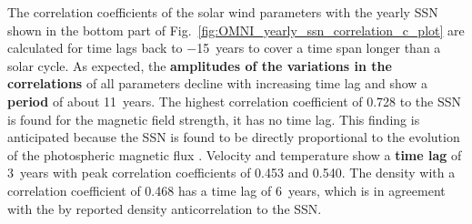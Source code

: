 The correlation coefficients of the solar wind parameters with the yearly SSN shown in the bottom part of Fig.~\ref{fig:OMNI_yearly_ssn_correlation_c_plot} are calculated for time lags back to \num{-15}~years to cover a time span longer than a solar cycle. As expected, the \textbf{amplitudes of the variations in the correlations} of all parameters decline with increasing time lag and show a \textbf{period} of about 11~years. The highest correlation coefficient of 0.728 to the SSN is found for the magnetic field strength, it has no time lag. This finding is anticipated because the SSN is found to be directly proportional to the evolution of the photospheric magnetic flux \citep{Smith2003}.
Velocity and temperature show a \textbf{time lag} of 3~years with peak correlation coefficients of 0.453 and 0.540. The density with a correlation coefficient of 0.468 has a time lag of 6~years, which is in agreement with the by \citet{Bougeret1984} reported density anticorrelation to the SSN.	%

